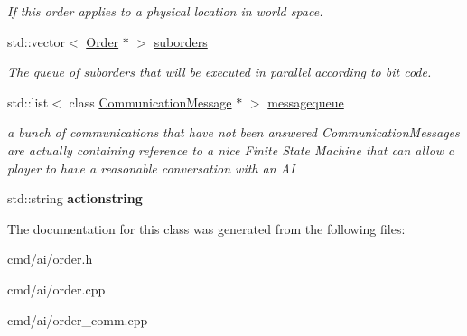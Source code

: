 \begin{DoxyCompactItemize}
\begin{DoxyCompactList}\small\item\em If this order applies to a physical location in world space. \end{DoxyCompactList}\item 
std\+::vector$<$ \hyperlink{classOrder}{Order} $\ast$ $>$ \hyperlink{classOrder_a860bba0b8b346702e826bda4a6ea3ded}{suborders}\hypertarget{classOrder_a860bba0b8b346702e826bda4a6ea3ded}{}\label{classOrder_a860bba0b8b346702e826bda4a6ea3ded}

\begin{DoxyCompactList}\small\item\em The queue of suborders that will be executed in parallel according to bit code. \end{DoxyCompactList}\item 
std\+::list$<$ class \hyperlink{classCommunicationMessage}{Communication\+Message} $\ast$ $>$ \hyperlink{classOrder_a878e1a44eec9a58170a9dd7b2daa1b24}{messagequeue}\hypertarget{classOrder_a878e1a44eec9a58170a9dd7b2daa1b24}{}\label{classOrder_a878e1a44eec9a58170a9dd7b2daa1b24}

\begin{DoxyCompactList}\small\item\em a bunch of communications that have not been answered Communication\+Messages are actually containing reference to a nice Finite State Machine that can allow a player to have a reasonable conversation with an AI \end{DoxyCompactList}\item 
std\+::string {\bfseries actionstring}\hypertarget{classOrder_a22c46a36e7fbf3cfbb4efd1b31dc5844}{}\label{classOrder_a22c46a36e7fbf3cfbb4efd1b31dc5844}

\end{DoxyCompactItemize}


The documentation for this class was generated from the following files\+:\begin{DoxyCompactItemize}
\item 
cmd/ai/order.\+h\item 
cmd/ai/order.\+cpp\item 
cmd/ai/order\+\_\+comm.\+cpp\end{DoxyCompactItemize}
